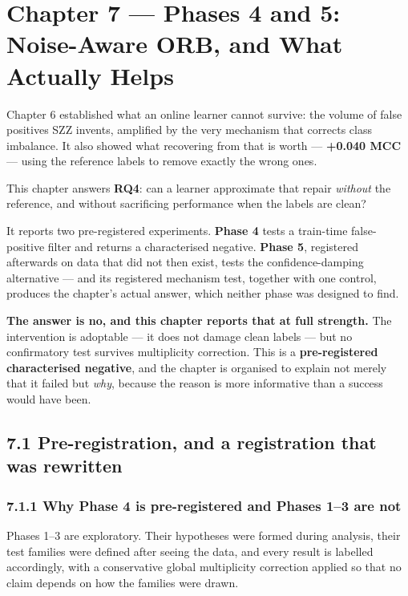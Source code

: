 \chapter{Chapter 7 --- Phases 4 and 5: Noise-Aware ORB, and What
Actually
Helps}\label{chapter-7-phases-4-and-5-noise-aware-orb-and-what-actually-helps}

Chapter 6 established what an online learner cannot survive: the volume
of false positives SZZ invents, amplified by the very mechanism that
corrects class imbalance. It also showed what recovering from that is
worth --- \textbf{+0.040 MCC} --- using the reference labels to remove
exactly the wrong ones.

This chapter answers \textbf{RQ4}: can a learner approximate that repair
\emph{without} the reference, and without sacrificing performance when
the labels are clean?

It reports two pre-registered experiments. \textbf{Phase 4} tests a
train-time false-positive filter and returns a characterised negative.
\textbf{Phase 5}, registered afterwards on data that did not then exist,
tests the confidence-damping alternative --- and its registered
mechanism test, together with one control, produces the chapter's actual
answer, which neither phase was designed to find.

\textbf{The answer is no, and this chapter reports that at full
strength.} The intervention is adoptable --- it does not damage clean
labels --- but no confirmatory test survives multiplicity correction.
This is a \textbf{pre-registered characterised negative}, and the
chapter is organised to explain not merely that it failed but
\emph{why}, because the reason is more informative than a success would
have been.

\section{7.1 Pre-registration, and a registration that was
rewritten}\label{pre-registration-and-a-registration-that-was-rewritten}

\subsection{7.1.1 Why Phase 4 is pre-registered and Phases 1--3 are
not}\label{why-phase-4-is-pre-registered-and-phases-13-are-not}

Phases 1--3 are exploratory. Their hypotheses were formed during
analysis, their test families were defined after seeing the data, and
every result is labelled accordingly, with a conservative global
multiplicity correction applied so that no claim depends on how the
families were drawn.

